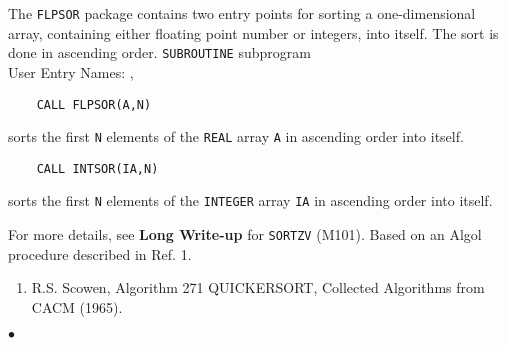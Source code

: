                          
                     
\Submitter{}                                
The {\tt FLPSOR} package contains two entry points for sorting a
one-dimensional array, containing either floating point number or
integers, into itself. The sort is done in ascending order.
\Structure
{\tt SUBROUTINE} subprogram \\
User Entry Names: , 
\Usage
\begin{verbatim}
    CALL FLPSOR(A,N)
\end{verbatim}
sorts the first {\tt N} elements of the {\tt REAL} array {\tt A} in
ascending order into itself.
\begin{verbatim}
    CALL INTSOR(IA,N)
\end{verbatim}
sorts the first {\tt N} elements of the {\tt INTEGER} array {\tt IA} in
ascending order into itself.
\par
For more details, see {\bf Long Write-up} for {\tt SORTZV} (M101).
\Source
Based on an Algol procedure described in Ref. 1.
\Refer
\begin{enumerate}
\item R.S. Scowen, Algorithm 271 QUICKERSORT, Collected Algorithms
from CACM (1965).
\end{enumerate}
$\bullet$
